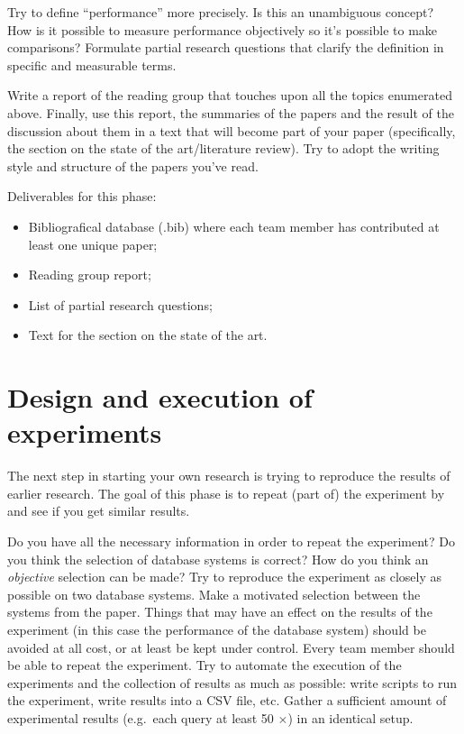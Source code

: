 \documentclass[fleqn,10pt]{artikeltin}
\begin{document}
Try to define ``performance'' more precisely. Is this an unambiguous concept? How is it possible to measure performance objectively so it's possible to make comparisons? Formulate partial research questions that clarify the definition in specific and measurable terms.

Write a report of the reading group that touches upon all the topics enumerated above. Finally, use this report, the summaries of the papers and the result of the discussion about them in a text that will become part of your paper (specifically, the section on the state of the art/literature review). Try to adopt the writing style and structure of the papers you've read.

Deliverables for this phase:

\begin{itemize}
	\item Bibliografical database (.bib) where each team member has contributed at least one unique paper;
	\item Reading group report;
	\item List of partial research questions;
	\item Text for the section on the state of the art.
\end{itemize}

\section{Design and execution of experiments}
\label{sec:experiments}

The next step in starting your own research is trying to reproduce the results of earlier research. The goal of this phase is to repeat (part of) the experiment by~\textcite{Bassil2012} and see if you get similar results.

Do you have all the necessary information in order to repeat the experiment? Do you think the selection of database systems is correct? How do you think an \emph{objective} selection can be made? Try to reproduce the experiment as closely as possible on two database systems. Make a motivated selection between the systems from the paper. Things that may have an effect on the results of the experiment (in this case the performance of the database system) should be avoided at all cost, or at least be kept under control. Every team member should be able to repeat the experiment. Try to automate the execution of the experiments and the collection of results as much as possible: write scripts to run the experiment, write results into a CSV file, etc. Gather a sufficient amount of experimental results (e.g.~each query at least 50 $\times$) in an identical setup.
\end{document}
